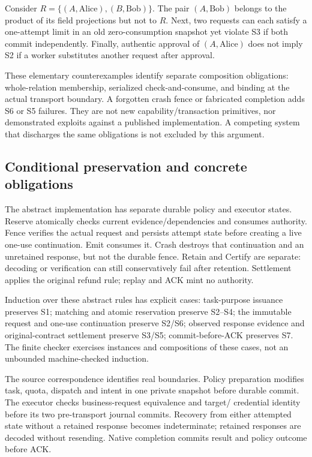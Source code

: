 \documentclass[letterpaper,twocolumn,10pt]{article}
\begin{document}
Consider $R=\{(A,\mathrm{Alice}),(B,\mathrm{Bob})\}$. The pair
$(A,\mathrm{Bob})$ belongs to the product of its field projections but not
to $R$. Next, two requests can each satisfy a one-attempt limit in an old
zero-consumption snapshot yet violate S3 if both commit independently.
Finally, authentic approval of $(A,\mathrm{Alice})$ does not imply S2 if a
worker substitutes another request after approval.

These elementary counterexamples identify separate composition obligations:
whole-relation membership, serialized check-and-consume, and binding at the
actual transport boundary. A forgotten crash fence or fabricated completion
adds S6 or S5 failures. They are not new capability/transaction primitives,
nor demonstrated exploits against a published implementation. A competing
system that discharges the same obligations is not excluded by this argument.

\subsection{Conditional preservation and concrete obligations}

The abstract implementation has separate durable policy and executor states.
Reserve atomically checks current evidence/dependencies and consumes authority.
Fence verifies the actual request and persists attempt state before creating a
live one-use continuation. Emit consumes it. Crash destroys that continuation
and an unretained response, but not the durable fence. Retain and Certify are
separate: decoding or verification can still conservatively fail after
retention. Settlement applies the original refund rule; replay and ACK mint
no authority.

Induction over these abstract rules has explicit cases: task-purpose issuance
preserves S1; matching and atomic reservation preserve S2--S4; the immutable
request and one-use continuation preserve S2/S6; observed response evidence
and original-contract settlement preserve S3/S5; commit-before-ACK preserves
S7. The finite checker exercises instances and compositions of these cases,
not an unbounded machine-checked induction.

The source correspondence identifies real boundaries. Policy preparation
modifies task, quota, dispatch and intent in one private snapshot before
durable commit. The executor checks business-request equivalence and target/
credential identity before its two pre-transport journal commits.
Recovery from either attempted state without a retained response becomes
indeterminate; retained responses are decoded without resending.
Native completion commits result and policy outcome before ACK.
\end{document}
